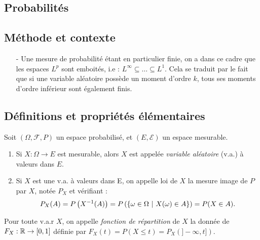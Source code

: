 \documentclass[11pt,a4paper]{article}
\begin{document}
\newpage
\begin{center}
\section*{Probabilités} 
\end{center}




\subsection*{Méthode et contexte}
\begin{itemize}
\item[-] Une mesure de probabilité étant en particulier finie, on a dans ce cadre que les espaces $L^p$ sont emboités, i.e : $L^\infty \subseteq \dots \subseteq L^1$. Cela se traduit par le fait que si une variable aléatoire possède un moment d'ordre $k$, tous ses moments d'ordre inférieur sont également finis.
\end{itemize}

\subsection*{Définitions et propriétés élémentaires}

\begin{definstar} Soit  $(\Omega, \mathcal{F}, P)$ un espace probabilisé, et $(E,\mathcal{E})$ un espace mesurable.
\begin{enumerate}
\item Si $X: \Omega \to E$ est mesurable, alors $X$ est appelée \textit{variable aléatoire} (v.a.) à valeurs dans $E$.
\item Si $X$ est une v.a. à valeurs dans E, on appelle loi de $X$ la mesure image de $P$ par $X$, notée $P_X$ et vérifiant : 
\[P_X(A) = P\left(X^{-1}(A)\right)=P\left(\left\{ \omega\in \Omega \ \middle| \  X(\omega)\in A \right\}\right) =P(X\in A).\]
\end{enumerate}
\end{definstar}

\begin{definstar}
Pour toute v.a.r $X$, on appelle \textit{fonction de répartition} de $X$ la donnée de $F_X :\mathbb R \to [0,1]$ définie par $F_X(t) = P(X\leq t) = P_X(]-\infty,t])$.
\end{definstar}
\end{document}
